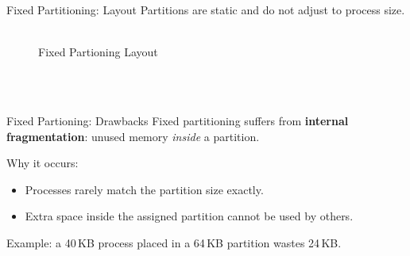 \documentclass[11pt]{beamer}
\begin{document}
    \begin{frame}[t]{Fixed Partitioning: Layout}
        Partitions are static and do not adjust to process size.\\~\\
        \begin{figure}[h!]
            \centering
            \caption{Fixed Partioning Layout}
            \label{fig:frixed-partioning}
        \end{figure}
        \\~\\
    \end{frame}


    \begin{frame}[t]{Fixed Partioning: Drawbacks}
        Fixed partitioning suffers from \textbf{internal fragmentation}:
        unused memory \emph{inside} a partition.

        \medskip

        Why it occurs:
        \begin{itemize}
            \item Processes rarely match the partition size exactly.
            \item Extra space inside the assigned partition cannot be used by others.
        \end{itemize}

        \medskip
        Example: a 40\,KB process placed in a 64\,KB partition wastes 24\,KB.
    \end{frame}
\end{document}
